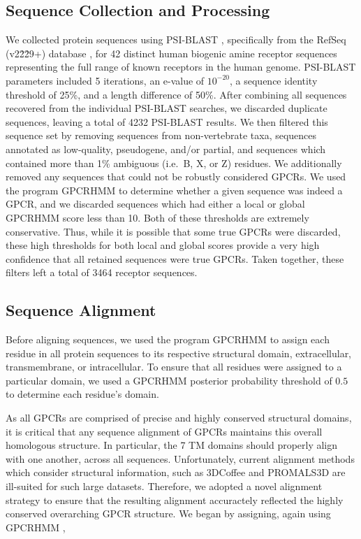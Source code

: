 \documentclass[fleqn,10pt]{wlpeerj}
\begin{document}
\subsection*{Sequence Collection and Processing}
We collected protein sequences using PSI-BLAST \citep{psiblast}, specifically from the RefSeq (v2\.2\.29+) database \citep{refseq}, for 42 distinct human biogenic amine receptor sequences representing the full range of known receptors in the human genome. PSI-BLAST parameters included 5 iterations, an e-value of $10^{-20}$, a sequence identity threshold of 25\%, and a length difference of 50\%. After combining all sequences recovered from the individual PSI-BLAST searches, we discarded duplicate sequences, leaving a total of 4232 PSI-BLAST results. We then filtered this sequence set by removing sequences from non-vertebrate taxa, sequences annotated as low-quality, pseudogene, and/or partial, and sequences which contained more than 1\% ambiguous (i.e.\ B, X, or Z) residues. We additionally removed any sequences that could not be robustly considered GPCRs. We used the program GPCRHMM \citep{Wistrand2006} to determine whether a given sequence was indeed a GPCR, and we discarded sequences which had either a local or global GPCRHMM score less than 10. Both of these thresholds are extremely conservative. Thus, while it is possible that some true GPCRs were discarded, these high thresholds for both local and global scores provide a very high confidence that all retained sequences were true GPCRs. Taken together, these filters left a total of 3464 receptor sequences.


\subsection*{Sequence Alignment}
Before aligning sequences, we used the program GPCRHMM \citep{Wistrand2006} to assign each residue in all protein sequences to its respective structural domain, extracellular, transmembrane, or intracellular. To ensure that all residues were assigned to a particular domain, we used a GPCRHMM posterior probability threshold of $0.5$ to determine each residue's domain. 

As all GPCRs are comprised of precise and highly conserved structural domains, it is critical that any sequence alignment of GPCRs maintains this overall homologous structure. In particular, the 7 TM domains should properly align with one another, across all sequences. Unfortunately, current alignment methods which consider structural information, such as 3DCoffee \citep{3dcoffee} and PROMALS3D \citep{promals3d} are ill-suited for such large datasets. Therefore, we adopted a novel alignment strategy to ensure that the resulting alignment accuractely reflected the highly conserved overarching GPCR structure. We began by assigning, again using GPCRHMM \citep{Wistrand2006}, 
\end{document}
